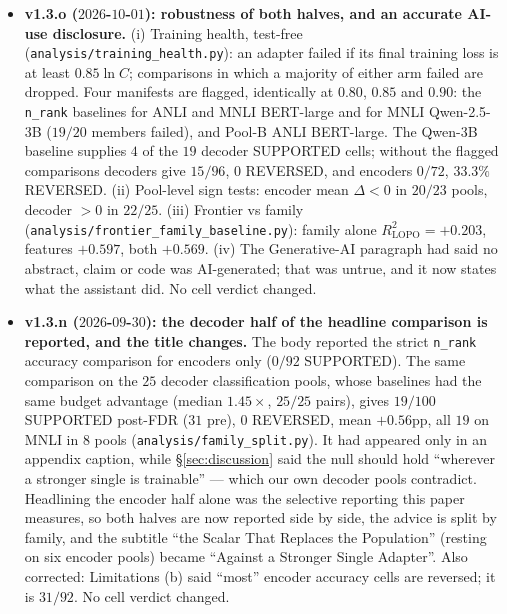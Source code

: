 \documentclass[11pt]{article}
\begin{document}
\begin{itemize}[leftmargin=*]
\item \textbf{v1.3.o ($2026$-$10$-$01$): robustness of both halves, and an accurate AI-use disclosure.} (i) Training health, test-free (\texttt{analysis/\allowbreak training\_\allowbreak health.\allowbreak py}): an adapter failed if its final training loss is at least $0.85\ln C$; comparisons in which a majority of either arm failed are dropped. Four manifests are flagged, identically at $0.80$, $0.85$ and $0.90$: the \texttt{n\_rank} baselines for ANLI and MNLI BERT-large and for MNLI Qwen-2.5-3B ($19/20$ members failed), and Pool-B ANLI BERT-large. The Qwen-3B baseline supplies $4$ of the $19$ decoder SUPPORTED cells; without the flagged comparisons decoders give $15/96$, $0$ REVERSED, and encoders $0/72$, $33.3\%$ REVERSED. (ii) Pool-level sign tests: encoder mean $\Delta{<}0$ in $20/23$ pools, decoder ${>}0$ in $22/25$. (iii) Frontier vs family (\texttt{analysis/\allowbreak frontier\_\allowbreak family\_\allowbreak baseline.\allowbreak py}): family alone $R^2_{\text{LOPO}}{=}{+}0.203$, features ${+}0.597$, both ${+}0.569$. (iv) The Generative-AI paragraph had said no abstract, claim or code was AI-generated; that was untrue, and it now states what the assistant did. No cell verdict changed.
\item \textbf{v1.3.n ($2026$-$09$-$30$): the decoder half of the headline comparison is reported, and the title changes.} The body reported the strict \texttt{n\_rank} accuracy comparison for encoders only ($0/92$ SUPPORTED). The same comparison on the $25$ decoder classification pools, whose baselines had the same budget advantage (median $1.45\times$, $25/25$ pairs), gives $19/100$ SUPPORTED post-FDR ($31$ pre), $0$ REVERSED, mean ${+}0.56$pp, all $19$ on MNLI in $8$ pools (\texttt{analysis/\allowbreak family\_\allowbreak split.\allowbreak py}). It had appeared only in an appendix caption, while \S\ref{sec:discussion} said the null should hold ``wherever a stronger single is trainable'' --- which our own decoder pools contradict. Headlining the encoder half alone was the selective reporting this paper measures, so both halves are now reported side by side, the advice is split by family, and the subtitle ``the Scalar That Replaces the Population'' (resting on six encoder pools) became ``Against a Stronger Single Adapter''. Also corrected: Limitations (b) said ``most'' encoder accuracy cells are reversed; it is $31/92$. No cell verdict changed.

\end{itemize}
\end{document}
